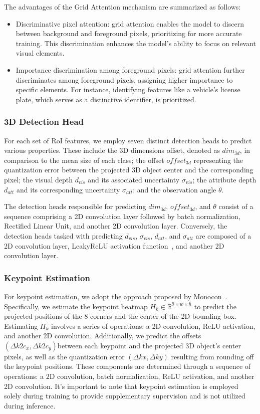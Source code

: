 \documentclass[journal]{IEEEtran}
\newcommand{\R}{\mathbb{R}}
\begin{document}
	The advantages of the Grid Attention mechanism are summarized as follows:
	\begin{itemize}
		\item Discriminative pixel attention: grid attention enables the model to discern between background and foreground pixels, prioritizing for more accurate training. This discrimination enhances the model's ability to focus on relevant visual elements.
		\item Importance discrimination among foreground pixels: grid attention further discriminates among foreground pixels, assigning higher importance to specific elements. For instance, identifying features like a vehicle's license plate, which serves as a distinctive identifier, is prioritized.
	\end{itemize}
	
	\subsubsection{3D Detection Head}\label{3d_detection_head}
	
	For each set of RoI features, we employ seven distinct detection heads to predict various properties. These include the 3D dimensions offset, denoted as $dim_{3d}$, in comparison to the mean size of each class; the offset $offset_{3d}$ representing the quantization error between the projected 3D object center and the corresponding pixel; the visual depth $d_{vis}$ and its associated uncertainty $\sigma_{vis}$; the attribute depth $d_{att}$ and its corresponding uncertainty $\sigma_{att}$; and the observation angle $\theta$.
	
	The detection heads responsible for predicting $dim_{3d}$, $offset_{3d}$, and $\theta$ consist of a sequence comprising a 2D convolution layer followed by batch normalization, Rectified Linear Unit, and another 2D convolution layer. Conversely, the detection heads tasked with predicting $d_{vis}$, $\sigma_{vis}$, $d_{att}$, and $\sigma_{att}$ are composed of a 2D convolution layer, LeakyReLU activation function~\cite{leaky-relu}, and another 2D convolution layer.
	
	\subsubsection{Keypoint Estimation}
	For keypoint estimation, we adopt the approach proposed by Monocon~\cite{monocon}. Specifically, we estimate the keypoint heatmap $H_k \in \R^{9\times w \times h}$ to predict the projected positions of the 8 corners and the center of the 2D bounding box. Estimating $H_k$ involves a series of operations: a 2D convolution, ReLU activation, and another 2D convolution. Additionally, we predict the offsets $(\Delta k2c_x, \Delta k2c_y)$between each keypoint and the projected 3D object's center pixels, as well as the quantization error $(\Delta kx, \Delta ky)$ resulting from rounding off the keypoint positions. These components are determined through a sequence of operations: a 2D convolution, batch normalization, ReLU activation, and another 2D convolution. It's important to note that keypoint estimation is employed solely during training to provide supplementary supervision and is not utilized during inference.
	
\end{document}
